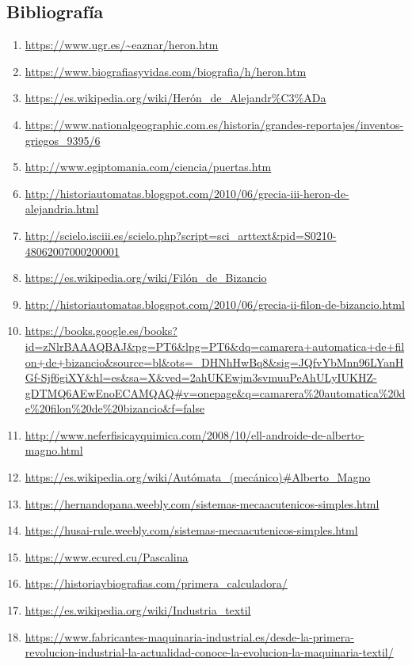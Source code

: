 \newpage

\subsection{Bibliografía}

\begin{enumerate}

\item \url{https://www.ugr.es/~eaznar/heron.htm}
\item\url{https://www.biografiasyvidas.com/biografia/h/heron.htm}
\item\url{https://es.wikipedia.org/wiki/Herón_de_Alejandr\%C3\%ADa}
\item\url{https://www.nationalgeographic.com.es/historia/grandes-reportajes/inventos-griegos\_9395/6}
\item\url{http://www.egiptomania.com/ciencia/puertas.htm}
\item\url{http://historiautomatas.blogspot.com/2010/06/grecia-iii-heron-de-alejandria.html}
\item\url{http://scielo.isciii.es/scielo.php?script=sci\_arttext&pid=S0210-48062007000200001}
\item\url{https://es.wikipedia.org/wiki/Filón_de_Bizancio}
\item\url{http://historiautomatas.blogspot.com/2010/06/grecia-ii-filon-de-bizancio.html}
\item\url{https://books.google.es/books?id=zNlrBAAAQBAJ&pg=PT6&lpg=PT6&dq=camarera+automatica+de+filon+de+bizancio&source=bl&ots=_DHNhHwBq8&sig=JQfvYbMnn96LYanHGf-Sjf6giXY&hl=es&sa=X&ved=2ahUKEwjm3svmuuPeAhULyIUKHZ-gDTMQ6AEwEnoECAMQAQ#v=onepage&q=camarera\%20automatica\%20de\%20filon\%20de\%20bizancio&f=false}
\item\url{http://www.neferfisicayquimica.com/2008/10/ell-androide-de-alberto-magno.html}
\item\url{https://es.wikipedia.org/wiki/Autómata_(mecánico)#Alberto_Magno}
\item\url{https://hernandopana.weebly.com/sistemas-mecaacutenicos-simples.html}
\item\url{https://husai-rule.weebly.com/sistemas-mecaacutenicos-simples.html}


\item\url{https://www.ecured.cu/Pascalina}
\item\url{https://historiaybiografias.com/primera\_calculadora/}

\item\url{https://es.wikipedia.org/wiki/Industria\_textil}
\item\url{https://www.fabricantes-maquinaria-industrial.es/desde-la-primera-revolucion-industrial-la-actualidad-conoce-la-evolucion-la-maquinaria-textil/}


\end{enumerate}
